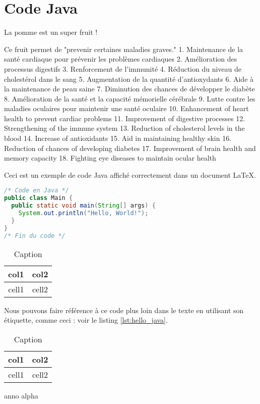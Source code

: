 \documentclass{article}
\begin{document}
\section{Code Java}

La pomme est un super fruit !

Ce fruit permet de "prevenir certaines maladies graves."
1. Maintenance de la santé cardiaque pour prévenir les problèmes cardiaques
2. Amélioration des processus digestifs
3. Renforcement de l'immunité
4. Réduction du niveau de cholestérol dans le sang
5. Augmentation de la quantité d'antioxydants
6. Aide à la maintenance de peau saine
7. Diminution des chances de développer le diabète
8. Amélioration de la santé et la capacité mémorielle cérébrale
9. Lutte contre les maladies oculaires pour maintenir une santé oculaire
10. Enhancement of heart health to prevent cardiac problems
11. Improvement of digestive processes
12. Strengthening of the immune system
13. Reduction of cholesterol levels in the blood
14. Increase of antioxidants
15. Aid in maintaining healthy skin
16. Reduction of chances of developing diabetes
17. Improvement of brain health and memory capacity
18. Fighting eye diseases to maintain ocular health

Ceci est un exemple de code Java affiché correctement dans un document LaTeX.

\begin{lstlisting}[language=Java, caption={Exemple "Hello, World!" en Java.}, label={lst:hello_java}]
/* Code en Java */
public class Main {
  public static void main(String[] args) {
    System.out.println("Hello, World!");
  }
}
/* Fin du code */
\end{lstlisting}

\begin{table}[h!]
    \centering
    \begin{tabular}{|c|c|}
        \hline
        col1 & col2 \\
        \hline
        cell1 & cell2 \\
        \hline
    \end{tabular}
    \caption{Caption}
    \label{tab:my_label}
\end{table}

Nous pouvons faire référence à ce code plus loin dans le texte en utilisant son étiquette, comme ceci : voir le listing \ref{lst:hello_java}.


\begin{table}[h!]
    \centering
    \begin{tabular}{|c|c|}
        \hline
        col1 & col2 \\
        \hline
        cell1 & cell2 \\
        \hline
    \end{tabular}
    \caption{Caption}
    \label{tab:my_label}
\end{table}

anno	
alpha 		
\end{document}
